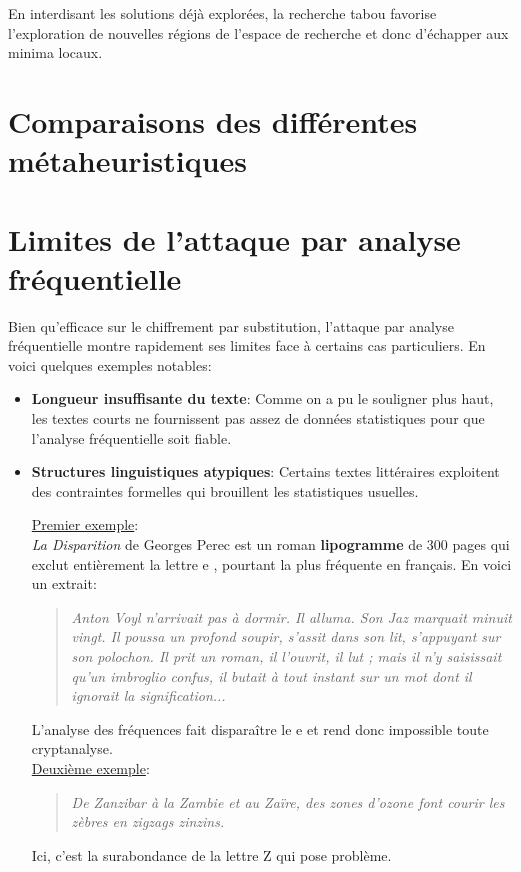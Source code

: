 \documentclass[a4paper]{article}
\begin{document}
En interdisant les solutions déjà explorées, la recherche tabou favorise l'exploration de nouvelles régions de l'espace de recherche et donc d'échapper aux minima locaux.

\section{Comparaisons des différentes métaheuristiques}
\label{sec:comparaison_meta}


\section{Limites de l'attaque par analyse fréquentielle}

Bien qu'efficace sur le chiffrement par substitution, l'attaque par analyse fréquentielle montre rapidement ses limites face à certains cas particuliers. En voici quelques exemples notables:
\begin{itemize}
    \item \textbf{Longueur insuffisante du texte}: Comme on a pu le souligner plus haut, les textes courts ne fournissent pas assez de données statistiques pour que l'analyse fréquentielle soit fiable.
    \item \textbf{Structures linguistiques atypiques}: Certains textes littéraires exploitent des contraintes formelles qui brouillent les statistiques usuelles. 

    \underline{Premier exemple}:\\

    \textit{La Disparition} de Georges Perec est un roman \textbf{lipogramme} de 300 pages qui exclut entièrement la lettre \og e \fg{}, pourtant la plus fréquente en français. En voici un extrait:

    \begin{quote}
        \textit{Anton Voyl n’arrivait pas à dormir. Il alluma. Son Jaz marquait minuit vingt. Il poussa un profond soupir, s’assit dans son lit, s’appuyant sur son polochon. Il prit un roman, il l’ouvrit, il lut ; mais il n’y saisissait qu’un imbroglio confus, il butait à tout instant sur un mot dont il ignorait la signification...}
    \end{quote}

    L’analyse des fréquences fait disparaître le \og e \fg{} et rend donc impossible toute cryptanalyse.\\

    \underline{Deuxième exemple}:

    \begin{quote}
        \textit{De Zanzibar à la Zambie et au Zaïre, des zones d’ozone font courir les zèbres en zigzags zinzins.}
    \end{quote}

    Ici, c’est la surabondance de la lettre \og Z \fg{} qui pose problème.


\end{itemize}
\end{document}
